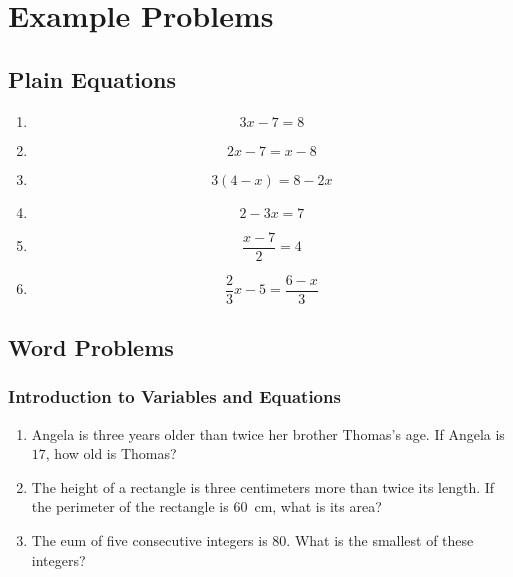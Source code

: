 \documentclass{article}
\begin{document}
    \section*{Example Problems}
    \subsection*{Plain Equations}
    \begin{enumerate}
        \item \[3x - 7 = 8\]
        \vspace{2cm}
        \item \[2x - 7 = x - 8\]
        \vspace{2cm}
        \item \[3(4 - x) = 8 - 2x\]
        \vspace{2cm}
        \item \[2 - 3x = 7\]
        \vspace{2cm}
        \item \[\frac{x - 7}{2} = 4\]
        \vspace{2cm}
        \item \[\frac{2}{3}x - 5 = \frac{6 - x}{3}\]
        \vspace{2cm}
    \end{enumerate}
    \subsection*{Word Problems}
    \subsubsection*{Introduction to Variables and Equations}
    \begin{enumerate}
        \item Angela is three years older than twice her brother Thomas's age. If Angela is $17$, how old is Thomas?
        \vspace{3cm}
        \item The height of a rectangle is three centimeters more than twice its length. If the perimeter of the rectangle is \SI{60}{\cm}, what is its area?
        \vspace{3cm}
        \item The eum of five consecutive integers is $80$. What is the smallest of these integers?
        \vspace{3cm}
    \end{enumerate}
\end{document}
